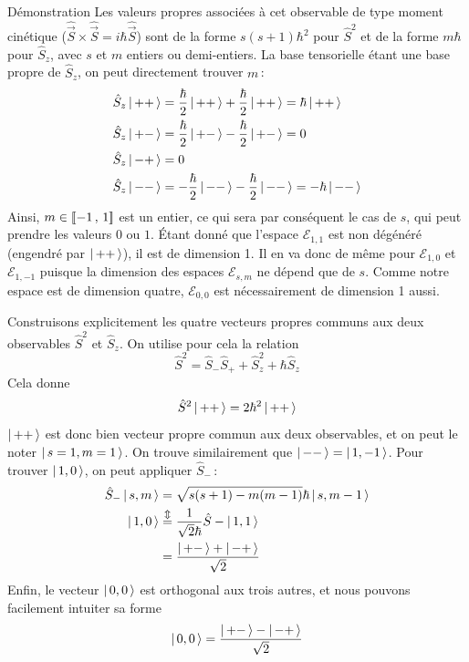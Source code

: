         \begin{demo}{Démonstration}
            Les valeurs propres associées à cet observable de type moment cinétique ($\hat{\vec{S}} \times \hat{\vec{S}} = i \hbar \hat{\vec{S}}$) sont de la forme $s(s+1)\hbar^2$ pour $\hat{S}^2$ et de la forme $m \hbar$ pour $\hat{S}_z$, avec $s$ et $m$ entiers ou demi-entiers. La base tensorielle étant une base propre de $\hat{S}_z$, on peut directement trouver $m$ :
        \begin{align*}
            \hat{S}_z \left| \, ++ \, \right> &= \frac{\hbar}{2} \left| \, ++ \, \right> + \frac{\hbar}{2} \left| \, ++ \, \right> = \hbar \left| \, ++ \, \right> \\
            \hat{S}_z \left| \, +- \, \right> &= \frac{\hbar}{2} \left| \, +- \, \right> - \frac{\hbar}{2} \left| \, +- \, \right> = 0 \\
            \hat{S}_z \left| \, -+ \, \right> &= 0 \\
            \hat{S}_z \left| \, -- \, \right> &= - \frac{\hbar}{2} \left| \, -- \, \right> - \frac{\hbar}{2} \left| \, -- \, \right> = - \hbar \left| \, -- \, \right> \\
        \end{align*}
        Ainsi, $m \in \left[\!\left[ -1 \, , \, 1 \right]\!\right]$ est un entier, ce qui sera par conséquent le cas de $s$, qui peut prendre les valeurs $0$ ou $1$. Étant donné que l’espace $\mathcal{E}_{1,1}$ est non dégénéré (engendré par $\left| \, ++ \, \right>$), il est de dimension 1. Il en va donc de même pour $\mathcal{E}_{1,0}$ et $\mathcal{E}_{1,-1}$ puisque la dimension des espaces $\mathcal{E}_{s,m}$ ne dépend que de $s$. Comme notre espace est de dimension quatre, $\mathcal{E}_{0,0}$ est nécessairement de dimension 1 aussi.

        Construisons explicitement les quatre vecteurs propres communs aux deux observables $\hat{S}^2$ et $\hat{S}_z$. On utilise pour cela la relation 
        \[ \hat{S}^2 = \hat{S}_- \hat{S}_+ + \hat{S}_z^2 + \hbar \hat{S}_z \]   
        Cela donne 
        \[\hat{S}^2 \left| \, ++ \, \right> = 2 \hbar^2 \left| \, ++ \, \right>\]
        $\left| \, ++ \, \right>$ est donc bien vecteur propre commun aux deux observables, et on peut le noter $\left| \, s=1,m=1 \, \right>$. On trouve similairement que $\left| \, -- \, \right> = \left| \, 1,-1 \, \right>$. Pour trouver $\left| \, 1,0 \, \right>$, on peut appliquer $\hat{S}_-$ :
        \begin{align*}
            \hat{S}_- \left| \, s,m \, \right> &= \sqrt{s(s+1) - m(m-1)} \hbar \left| \, s,m-1 \, \right> \\
            \left| \, 1,0 \, \right> &\overset{\Updownarrow}{=} \frac{1}{\sqrt{2}\hbar} \hat{S}- \left| \, 1,1 \, \right> \\
            &= \frac{\left| \, +- \, \right> + \left| \, -+ \, \right>}{\sqrt{2}}
        \end{align*}
        Enfin, le vecteur $\left| \, 0,0 \, \right>$ est orthogonal aux trois autres, et nous pouvons facilement intuiter sa forme 
        \[ \left| \, 0,0 \, \right> = \frac{\left| \, +- \, \right> - \left| \, -+ \, \right>}{\sqrt{2}} \]   
        \end{demo}

